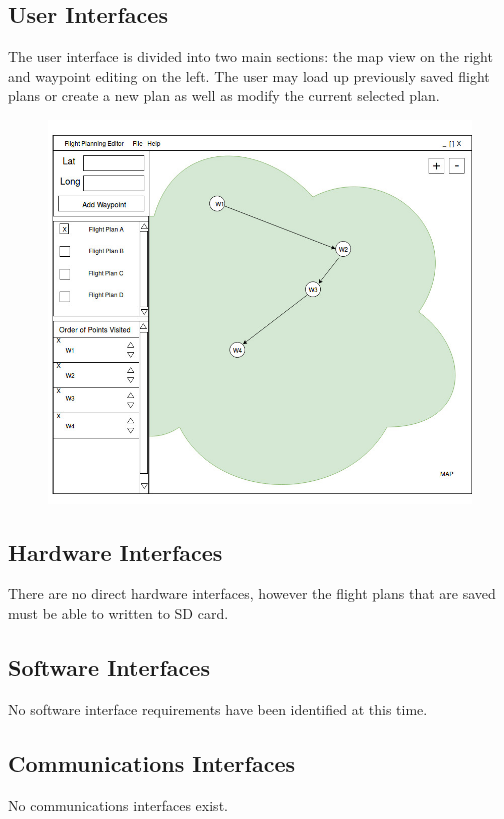 \documentclass[12pt, letterpaper]{article}
\begin{document}
\subsection{User Interfaces}
  The user interface is divided into two main sections: the map view on the right and waypoint editing on the left.
  The user may load up previously saved flight plans or create a new plan as well as modify the current selected plan.
  \begin{figure}[!ht]
    \includegraphics[scale=0.5]{images/FlightPlanning_Interface.jpg}
  \end{figure}

  \subsection{Hardware Interfaces}
    There are no direct hardware interfaces, however the flight plans that are saved must be able to written to SD card.

    \subsection{Software Interfaces}
     No software interface requirements have been identified at this time.
  \subsection{Communications Interfaces}
  No communications interfaces exist.
\end{document}
